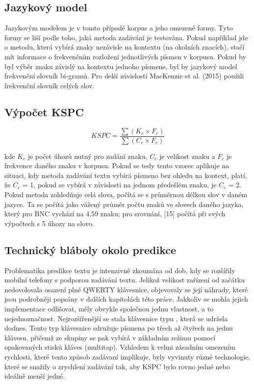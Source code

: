 \documentclass{article}
\begin{document}
\subsection{Jazykový model}

Jazykovým modelem je v tomto případě korpus a jeho omezené formy. Tyto formy se liší podle toho, jaká metoda zadávání je testována. Pokud například jde o metodu, která vybírá znaky nezávisle na kontextu (na okolních znacích), stačí mít informace o frekvenčním rozložení jednotlivých písmen v korpusu. Pokud by byl výběr znaku závislý na kontextu jednoho písmene, byl by jazykový model frekvenční slovník bi-gramů. Pro delší závislosti MacKenzie et al. (2015) použili frekvenční slovník celých slov.

\subsection{Výpočet KSPC}


\[
	KSPC = \frac{\sum{ (K_c × F_c) }}{\sum{ (C_c × F_c) }}
\]

kde $K_c$ je počet úhozů nutný pro zadání znaku, $C_c$ je velikost znaku a $F_c$ je frekvence daného znaku v korpusu. Pokud se tedy tento vzorec aplikuje na situaci, kdy metoda zadávání textu vybírá písmeno bez ohledu na kontext, platí, že $C_c$ = 1, pokud se vybírá v závislosti na jednom předešlém znaku, je $C_c$ = 2. Pokud metoda zohledňuje celá slova, počítá se s průměrnou délkou slov v daném jazyce. Ta se počítá jako vážený průměr počtu znaků ve slovech daného jazyka, který pro BNC vychází na 4,59 znaku; pro srovnání, [15] počítá při svých výpočtech s 5 úhozy na slovo.


\subsection{Technický bláboly okolo predikce}


Problematika predikce textu je intenzivně zkoumána od dob, kdy se rozšířily mobilní telefony s podporou zadávání textu. Jelikož velikost zařízení od začátku nedovolovala osazení plné QWERTY klávesnice, objevovaly se její náhrady, které jsou podrobněji popsány v dalších kapitolách této práce. Jakkoliv se mohla jejich implementace odlišovat, měly obvykle společnou jednu vlastnost, a to nejednoznačnost. Nejrozšířenější se stala klávesnice typu , která se udržela dodnes. Tento typ klávesnice sdružuje písmena po třech až čtyřech na jednu klávesu, přičemž ze skupiny se pak vybírá v základním režimu pomocí opakovaných stisků kláves (multitap). Vzhledem k velmi zásadním omezením rychlosti, které tento způsob zadávaní implikuje, byly vyvinuty různé technologie, které se snažily o zrychlení zadávání tak, aby KSPC bylo rovno jedné nebo ideálně menší jedné.
\end{document}
